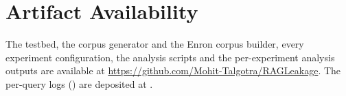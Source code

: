 \section*{Artifact Availability}
The testbed, the corpus generator and the Enron corpus builder, every experiment configuration, the
analysis scripts and the per-experiment analysis outputs are available at
\url{https://github.com/Mohit-Talgotra/RAGLeakage}. The per-query logs () are deposited
at .
